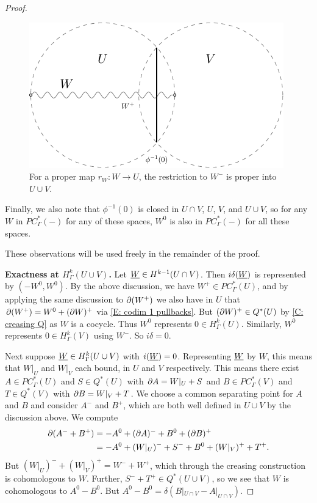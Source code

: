 \begin{proof}
\begin{figure}[h]
	\includegraphics[scale=1]{figures/mayer_vietoris2.pdf}
	\caption{For a proper map $r_W \colon W \to U$, the restriction to $W^-$ is proper into $U\cup V$. }
\label{F: MV2}
\end{figure}

Finally, we also note that $\phi^{-1}(0)$ is closed in $U\cap V$, $U$, $V$, and $U\cup V$, so for any $W$ in $PC_\Gamma^*(-)$ for any of these spaces, $W^0$ is also in $PC^*_\Gamma(-)$ for all these spaces.



These observations will be used freely in the remainder of the proof.

\textbf{Exactness at $H^k_\Gamma(U\cup V)$.}
Let $\underline{W}\in H^{k-1}(U\cap V)$. Then $i\delta(\underline{W})$ is represented by $(-W^0,  W^0)$. By the above discussion, we have $W^+\in PC^*_\Gamma(U)$, and by applying the same discussion to $\partial (W^+)$ we also have in $U$ that $\partial (W^+)=W^0+(\partial W)^+$ via \cref{E: codim 1 pullbacks}. But $(\partial W)^+\in Q^*(U)$ by \cref{C: creasing Q} as $W$ is a cocycle. Thus $W^0$ represents $0\in H^k_\Gamma(U)$. Similarly, $W^0$ represents $0\in H^k_\Gamma(V)$ using $W^-$. So $i\delta=0$.

Next suppose $\underline{W}\in H^k_\Gamma(U\cup V)$ with $i(\underline{W})=0$. Representing $\underline{W}$ by $W$, this means that $W|_U$ and $W|_V$ each bound, in $U$ and $V$ respectively. This means there exist  $A\in PC^*_\Gamma(U)$ and $S\in Q^*(U)$ with $\partial A=W|_U+S$ and $B\in PC^*_\Gamma(V)$ and $T\in Q^*(V)$ with $\partial B=W|_V+T$. We choose a common separating point for $A$ and $B$ and consider $A^-$ and $B^+$, which are both well defined in $U\cup V$ by the discussion above. We compute
\begin{align*}
\partial(A^-+B^+)&=-A^0 + (\partial A)^- +B^0+ (\partial B)^+\\
&=-A^0 + (W|_U)^-+S^-  +B^0+ (W|_V)^++T^+.
\end{align*}
But   $(W|_U)^- +(W|_V)^+=W^-+W^+$, which through the creasing construction is cohomologous to $W$. Further, $S^-+T^+\in Q^*(U\cup V)$, so we see that $W$ is cohomologous to $A^0-B^0$. But $A^0-B^0=\delta(B|_{U\cap V}-A|_{U\cap V})$.




\end{proof}
